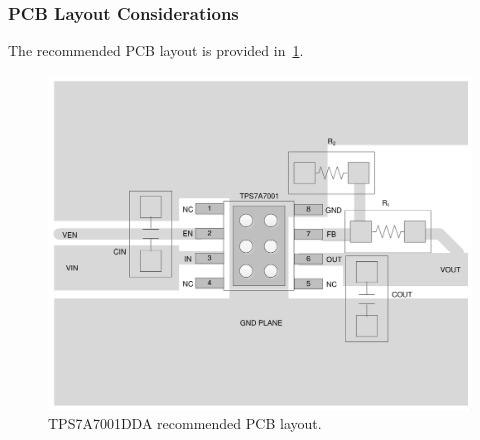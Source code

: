 \subsubsection{PCB Layout Considerations}
\label{sec:tps7a7001dda-pcb}

The recommended PCB layout is provided in~\ref{fig:tps7a7001dda-pcb}.

\begin{figure}[h]
        \centering
        \includegraphics[width=\textwidth]{data/tps7a7001dda-pcb}
        \caption{TPS7A7001DDA recommended PCB layout.}
        \label{fig:tps7a7001dda-pcb}
\end{figure}
